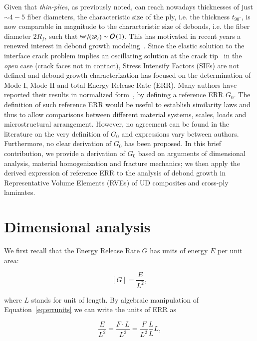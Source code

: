 \documentclass[review]{elsarticle}
\begin{document}
Given that \emph{thin-plies}, as previously noted, can reach nowadays thicknesses of just $\sim4-5$ fiber diameters, the characteristic size of the ply, i.e. the thickness $t_{90^{\circ}}$, is now comparable in magnitude to the characteristic size of debonds, i.e. the fiber diameter $2R_{f}$, such that $\nicefrac{t_{90^{\circ}}}{\left(2R_{f}\right)}\sim\mathcal{O}\left(1\right)$. This has motivated in recent years a renewed interest in debond growth modeling~\cite{Zhuang2018,Sandino2016,Varna2017,Sandino2018}. Since the elastic solution to the interface crack problem implies an oscillating solution at the crack tip~\cite{Comninou1977} in the \emph{open} case (crack faces not in contact), Stress Intensify Factors (SIFs) are not defined and debond growth characterization has focused on the determination of Mode I, Mode II and total Energy Release Rate (ERR). Many authors have reported their results in normalized form~\cite{Paris2007,Toya1974,Paris1996}, by defining a reference ERR $G_{0}$. The definition of such reference ERR would be useful to establish similarity laws and thus to allow comparisons between different material systems, scales, loads and microstructural arrangement. However, no agreement can be found in the literature on the very definition of $G_{0}$ and expressions vary between authors. Furthermore, no clear derivation of $G_{0}$ has been proposed. In this brief contribution, we provide a derivation of $G_{0}$ based on arguments of dimensional analysis, material homogenization and fracture mechanics; we then apply the derived expression of reference ERR to the analysis of debond growth in Representative Volume Elements (RVEs) of UD composites and cross-ply laminates. 

\section{Dimensional analysis}

We first recall that the Energy Release Rate $G$ has units of energy $E$ per unit area:

\begin{equation}\label{eq:errunits}
\left[G\right]=\frac{E}{L^{2}},
\end{equation}

where $L$ stands for unit of length. By algebraic manipulation of Equation~\ref{eq:errunits} we can write the units of ERR as

\begin{equation}\label{eq:errunitsreworked}
\frac{E}{L^{2}}=\frac{F\cdot L}{L^{2}}=\frac{F}{L^{2}}\frac{L}{L}L,
\end{equation}
\end{document}
